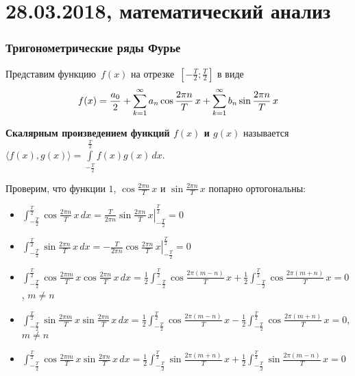 \chapter{28.03.2018, математический анализ}
\subsection{Тригонометрические ряды Фурье}
Представим функцию~$f(x)$ на отрезке~$\left[ -\frac{T}2; \frac{T}2 \right]$ в виде
\begin{equation*}
f(x) = \frac{a_0}2 + \series a_n \cos \frac{2 \pi n}T\,x + \series b_n \sin \frac{2 \pi n}T\,x
\end{equation*}

\textbf{Скалярным произведением функций $f(x)$ и $g(x)$} называется $\langle f(x), g(x) \rangle = \int\limits_{-\frac{T}2}^{\frac{T}2} f(x)g(x)\,dx$.

Проверим, что функции $1$, $\cos \frac{2 \pi n}T\,x$ и $\sin \frac{2 \pi n}T\,x$ попарно ортогональны:
\begin{itemize}
	\item $\displaystyle \int_{-\frac{T}2}^{\frac{T}2} \cos \frac{2 \pi n}T\,x\,dx =
	\frac{T}{2 \pi n} \left. \sin \frac{2 \pi n}T\,x \right|_{-\frac{T}2}^{\frac{T}2} = 0$
	
	\item $\displaystyle \int_{-\frac{T}2}^{\frac{T}2} \sin \frac{2 \pi n}T\,x\,dx =
	-\frac{T}{2 \pi n} \left. \cos \frac{2 \pi n}T\,x \right|_{-\frac{T}2}^{\frac{T}2} = 0$
	
	\item $\displaystyle \int_{-\frac{T}2}^{\frac{T}2} \cos \frac{2 \pi m}T\,x \cos \frac{2 \pi n}T\,x\,dx =
	\frac12 \int_{-\frac{T}2}^{\frac{T}2} \cos \frac{2 \pi (m - n)}T\,x +
	\frac12 \int_{-\frac{T}2}^{\frac{T}2} \cos \frac{2 \pi (m + n)}T\,x = 0$, $m \neq n$
	
	\item $\displaystyle \int_{-\frac{T}2}^{\frac{T}2} \sin \frac{2 \pi m}T\,x \sin \frac{2 \pi n}T\,x\,dx =
	\frac12 \int_{-\frac{T}2}^{\frac{T}2} \cos \frac{2 \pi (m - n)}T\,x -
	\frac12 \int_{-\frac{T}2}^{\frac{T}2} \cos \frac{2 \pi (m + n)}T\,x = 0$, $m \neq n$
	
	\item $\displaystyle \int_{-\frac{T}2}^{\frac{T}2} \cos \frac{2 \pi m}T\,x \sin \frac{2 \pi n}T\,x\,dx =
	\frac12 \int_{-\frac{T}2}^{\frac{T}2} \sin \frac{2 \pi (m + n)}T\,x +
	\frac12 \int_{-\frac{T}2}^{\frac{T}2} \sin \frac{2 \pi (m - n)}T\,x = 0$
\end{itemize}

